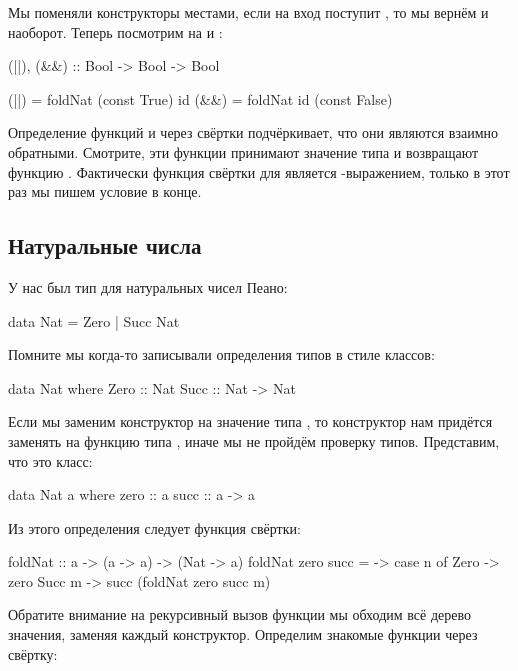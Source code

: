 Мы поменяли конструкторы местами, если на вход поступит
, то мы вернём  и наоборот. 
Теперь посмотрим на  и :

\begin{code}
(||), (&&) :: Bool -> Bool -> Bool

(||) = foldNat  (const True)  id
(&&) = foldNat  id            (const False)
\end{code}

Определение функций  и  через свёртки
подчёркивает, что они являются взаимно обратными.
Смотрите, эти функции принимают значение типа 
и возвращают функцию . 
Фактически функция свёртки для  является 
-выражением, только в этот раз мы пишем условие
в конце. 

\subsection{Натуральные числа}

У нас был тип для натуральных чисел Пеано:

\begin{code}
data Nat = Zero | Succ Nat
\end{code}

Помните мы когда-то записывали определения типов в стиле классов:

\begin{code}
data Nat where
    Zero :: Nat
    Succ :: Nat -> Nat
\end{code}

Если мы заменим конструктор  на значение типа ,
то конструктор  нам придётся заменять на функцию
типа , иначе мы не пройдём проверку типов. 
Представим, что  это класс:

\begin{code}
data Nat a where
    zero :: a
    succ :: a -> a
\end{code}

Из этого определения следует функция свёртки:

\begin{code}
foldNat :: a -> (a -> a) -> (Nat -> a)
foldNat zero succ = \n -> case n of
    Zero    -> zero
    Succ m  -> succ (foldNat zero succ m)
\end{code}

Обратите внимание на рекурсивный вызов функции 
мы обходим всё дерево значения, заменяя каждый конструктор. 
Определим знакомые функции через свёртку:

